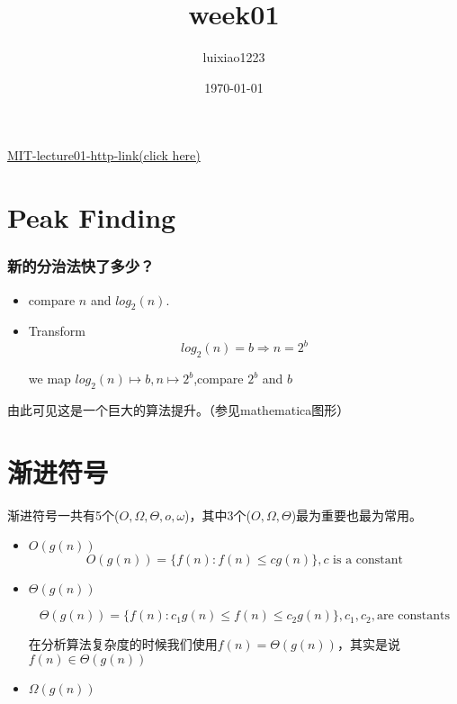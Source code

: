 \documentclass[11pt]{article}
\author{luixiao1223}
\date{\today}
\title{week01}
\begin{document}
\begin{CJK}{UTF8}{gbsn}
  
\href{https://ocw.mit.edu/courses/electrical-engineering-and-computer-science/6-006-introduction-to-algorithms-fall-2011/lecture-videos/MIT6\_006F11\_lec01.pdf}{MIT-lecture01-http-link(click here)}

\section{Peak Finding}
\subsubsection{新的分治法快了多少？}
\begin{itemize}
\item compare $n$ and $log_2(n)$.
\item Transform
  \begin{displaymath}
    log_2(n)=b \Rightarrow n=2^b
  \end{displaymath}

  we map $log_2(n)\mapsto b, n\mapsto 2^b$,compare $2^b$ and $b$
\end{itemize}

由此可见这是一个巨大的算法提升。（参见mathematica图形）

\section{渐进符号}

渐进符号一共有5个($O,\Omega,\Theta, o, \omega$)，其中3个($O,\Omega,\Theta$)最为重要也最为常用。

\begin{itemize}
\item $O(g(n))$
  \begin{displaymath}
    O(g(n))=\{f(n): f(n) \leqslant c g(n)\},c\mbox{ is a constant}
  \end{displaymath}

\item $\Theta(g(n))$

  \begin{displaymath}
    \Theta(g(n))=\{f(n):c_1g(n)\leqslant f(n) \leqslant c_2 g(n)\},c_1,c_2,\mbox{are constants}
  \end{displaymath}

  在分析算法复杂度的时候我们使用$f(n)=\Theta(g(n))$，其实是说$f(n)\in \Theta(g(n))$

\item $\Omega(g(n))$


\end{itemize}
\end{CJK}
\end{document}
